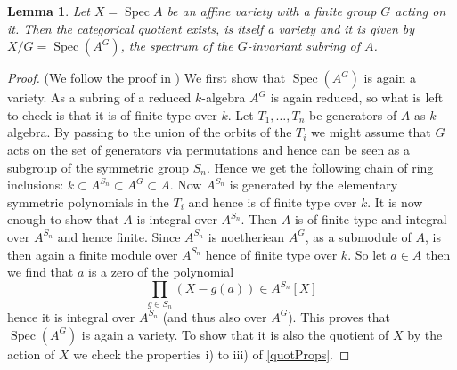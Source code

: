 \documentclass[11pt, a4paper, german, twoside]{article}
\theoremstyle{plain}
\newtheorem{lemma}[theorem]{Lemma}
\theoremstyle{definition}
\DeclareMathOperator{\Spec}{Spec}
\begin{document}
\begin{lemma}
    \label{quotAffine}
    Let $X = \Spec{A}$ be an affine variety with a finite group $G$ acting on it. Then the categorical quotient exists, is itself a variety and
    it is given by $X/G = \Spec(A^G)$, the spectrum of the $G$-invariant subring of $A$.
\end{lemma}
\begin{proof}(We follow the proof in \cite[Prop. A.1]{mustata})
    We first show that $\Spec(A^G)$ is again a variety. As a subring of a reduced $k$-algebra $A^G$ is again reduced, so what is left to check
    is that it is of finite type over $k$. Let $T_1,\dots,T_n$ be generators of $A$ as $k$-algebra. By passing to the union of the orbits of
    the $T_i$ we might assume that $G$ acts on the set of generators via permutations and hence can be seen as a subgroup of the 
    symmetric group $S_n$. Hence we get the following chain of ring inclusions: $k \subset A^{S_n} \subset A^G \subset A$. Now $A^{S_n}$ is
    generated by the elementary symmetric polynomials in the $T_i$ and hence is of finite type over $k$.
    It is now enough to show that $A$ is integral over $A^{S_n}$. Then $A$ is of finite type and integral over $A^{S_n}$ and hence
    finite. Since $A^{S_n}$ is noetheriean $A^G$, as a submodule of $A$, 
    is then again a finite module over $A^{S_n}$ hence of finite type over $k$.
    So let $a \in A$ then we find that $a$ is a zero of
    the polynomial
    \[
        \prod_{g \in S_n} (X - g(a))  \in A^{S_n}[X]
    \]
    hence it is integral over $A^{S_n}$ (and thus also over $A^G$).
    This proves that $\Spec(A^G)$ is again a variety. To show that it is also the quotient of $X$ by the action of $X$ we check the properties
    i) to iii) of \ref{quotProps}. 
    

\end{proof}
\end{document}
